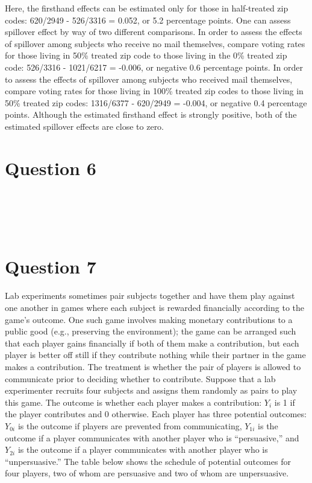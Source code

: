 \documentclass[11pt,notitlepage]{article}\usepackage[]{graphicx}\usepackage[]{color}
\makeatletter
\newenvironment{kframe}{%
 \def\at@end@of@kframe{}%
 \ifinner\ifhmode%
  \def\at@end@of@kframe{\end{minipage}}%
  \begin{minipage}{\columnwidth}%
 \fi\fi%
 \def\FrameCommand##1{\hskip\@totalleftmargin \hskip-\fboxsep
 \colorbox{shadecolor}{##1}\hskip-\fboxsep
     \hskip-\linewidth \hskip-\@totalleftmargin \hskip\columnwidth}%
 \MakeFramed {\advance\hsize-\width
   \@totalleftmargin\z@ \linewidth\hsize
   \@setminipage}}%
 {\par\unskip\endMakeFramed%
 \at@end@of@kframe}
\newenvironment{knitrout}{}{} %
\makeatother
\begin{document}
\begin{enumerate}[a)]
Here, the firsthand effects can be estimated only for those in half-treated zip codes: 620/2949 - 526/3316 = 0.052, or 5.2 percentage points. One can assess spillover effect by way of two different comparisons. In order to assess the effects of spillover among subjects who receive no mail themselves, compare voting rates for those living in 50\% treated zip code to those living in the 0\% treated zip code: 526/3316 - 1021/6217 = -0.006, or negative 0.6 percentage points. In order to assess the effects of spillover among subjects who received mail themselves, compare voting rates for those living in 100\% treated zip codes to those living in 50\% treated zip codes:  1316/6377 - 620/2949 = -0.004, or negative 0.4 percentage points.  Although the estimated firsthand effect is strongly positive, both of the estimated spillover effects are close to zero.
\end{enumerate}

\section*{Question 6}
\begin{knitrout}
\color{fgcolor}\begin{kframe}
\begin{verbatim}





\end{verbatim}
\end{kframe}
\end{knitrout}


\section*{Question 7}
Lab experiments sometimes pair subjects together and have them play against one another in games where each subject is rewarded financially according to the game's outcome. One such game involves making monetary contributions to a public good (e.g., preserving the environment); the game can be arranged such that each player gains financially if both of them make a contribution, but each player is better off still if they contribute nothing while their partner in the game makes a contribution. The treatment is whether the pair of players is allowed to communicate prior to deciding whether to contribute. Suppose that a lab experimenter recruits four subjects and assigns them randomly as pairs to play this game. The outcome is whether each player makes a contribution: $Y_i$ is 1 if the player contributes and 0 otherwise. Each player has three potential outcomes: $Y_{0i}$ is the outcome if players are prevented from communicating, $Y_{1i}$ is the outcome if a player communicates with another player who is ``persuasive,'' and $Y_{2i}$ is the outcome if a player communicates with another player who is ``unpersuasive.'' The table below shows the schedule of potential outcomes for four players, two of whom are persuasive and two of whom are unpersuasive.
\end{document}
